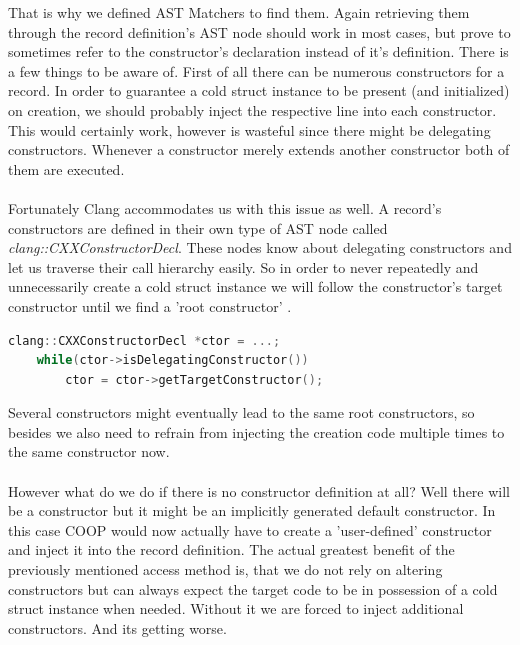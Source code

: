 That is why we defined AST Matchers to find them. Again retrieving them through the record definition's AST node should work in most cases, but prove to sometimes refer to the constructor's declaration instead of it's definition. There is a few things to be aware of. First of all there can be numerous constructors for a record. In order to guarantee a cold struct instance to be present (and initialized) on creation, we should probably inject the respective line into each constructor. This would certainly work, however is wasteful since there might be delegating constructors. Whenever a constructor merely extends another constructor both of them are executed.\\\\
Fortunately Clang accommodates us with this issue as well. A record's constructors are defined in their own type of AST node called \textit{clang::CXXConstructorDecl}. These nodes know about delegating constructors and let us traverse their call hierarchy easily. So in order to never repeatedly and unnecessarily create a cold struct instance we will follow the constructor's target constructor until we find a 'root constructor' .
\begin{lstlisting}[language=C++, name={Traversing the constructors' delegating constructors until we find a 'root' node.}, label={delegating_ctors}, morekeywords={clang, CXXConstructorDecl}]
	clang::CXXConstructorDecl *ctor = ...;
	while(ctor->isDelegatingConstructor())
		ctor = ctor->getTargetConstructor();
\end{lstlisting}
Several constructors might eventually lead to the same root constructors, so besides we also need to refrain from injecting the creation code multiple times to the same constructor now.\\\\
However what do we do if there is no constructor definition at all? Well there will be a constructor but it might be an implicitly generated default constructor. In this case COOP would now actually have to create a 'user-defined' constructor and inject it into the record definition. The actual greatest benefit of the previously mentioned access method is, that we do not rely on altering constructors but can always expect the target code to be in possession of a cold struct instance when needed. Without it we are forced to inject additional constructors. And its getting worse.

